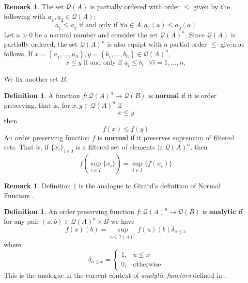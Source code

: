\documentclass[12pt]{article}
\theoremstyle{plain}
\theoremstyle{definition}
\newtheorem{defn}[thm]{Definition} %
\newtheorem{remark}[thm]{Remark}
\newcommand{\call}[1]{\mathcal{#1}}
\newcommand{\Ical}{\call{I}}
\newcommand{\Qcal}{\call{Q}}
\newcommand{\lto}{\longrightarrow}
\begin{document}
	\begin{remark}
		The set $\Qcal(A)$ is partially ordered with order $\leq$ given by the following with $\underline{a}_1, \underline{a}_2 \in \Qcal(A)$:
		\begin{equation}
			\underline{a}_1 \leq \underline{a}_2 \text{ if and only if }\forall a \in A, \underline{a}_1(a) \leq \underline{a}_2(a)
		\end{equation}
		Let $n > 0$ be a natural number and consider the set $\Qcal(A)^n$. Since $\Qcal(A)$ is partially ordered, the set $\Qcal(A)^n$ is also equipt with a partial order $\leq$ given as follows. If $x = (\underline{a}_1, \ldots, \underline{a_n}), y = (\underline{b}_1, \ldots, \underline{b_n}) \in \Qcal(A)^n$,
		\begin{equation}
			x \leq y\text{ if and only if }\underline{a}_i \leq \underline{b_i}\text{  }\forall i = 1, \ldots, n,
		\end{equation}
	\end{remark}
	
	We fix another set $B$.
	
	\begin{defn}\label{def:normal}
		A function $f: \Qcal(A)^n \lto \Qcal(B)$ is \textbf{normal} if it is order preserving, that is, for $x, y \in \Qcal(A)^n$ if
			\begin{equation}
				x \leq y
			\end{equation}
			then
			\begin{equation}
				f(x) \leq f(y)
			\end{equation}
		An order preserving function $f$ is \textbf{normal} if it preserves supremum of filtered sets. That is, if $\{ x_i \}_{i \in I}$ is a filtered set of elements in $\Qcal(A)^n$, then
			\begin{equation}
				f(\operatorname{sup}_{i \in I} \{ x_i \}) = \operatorname{sup}_{i \in I}\{ f(x_i) \}
			\end{equation}
	\end{defn}
	
	\begin{remark}
		Definition \ref{def:normal} is the analogue to Girard's definition of Normal Functors \cite[Definition 2.1]{Girard}.
	\end{remark}

\begin{defn}
	An order preserving function $f: \Qcal(A)^n \lto \Qcal(B)$ is \textbf{analytic} if for any pair $(x, b) \in \Qcal(A)^n \times B$ we have
	\begin{equation}
		f(x)(b) = \operatorname{sup}_{u \in \Ical(A)^n}f(u)(b)\delta_{u \leq x}
	\end{equation}
	where
	\begin{equation}
		\delta_{u \leq x} = 
		\begin{cases}
			1, & u \leq x\\
			0, & \text{otherwise}
		\end{cases}
	\end{equation}
	This is the analogue in the current context of \emph{analytic functors} defined in \cite[Definition 2.2]{Girard}. 
	\end{defn}
\end{document}
